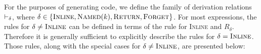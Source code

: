 \documentclass{article}
\begin{document}
    For the purposes of generating code, we define the family of derivation relations $\rwD$, where
    $\delta \in \{\textsc{Inline}, \textsc{Named$(k)$}, \textsc{Return}, \textsc{Forget}\}$. For
    most expressions, the rules for $\delta \neq \textsc{Inline}$ can be defined in terms of the
    rule for \textsc{Inline} and $R_{\delta}$. Therefore it is generally sufficient to explicitly
    describe the rules for $\delta = \textsc{Inline}$. Those rules, along with the special cases for
    $\delta \neq \textsc{Inline}$, are presented below:
%
    \begin{mathpar}







\end{mathpar}
\end{document}
